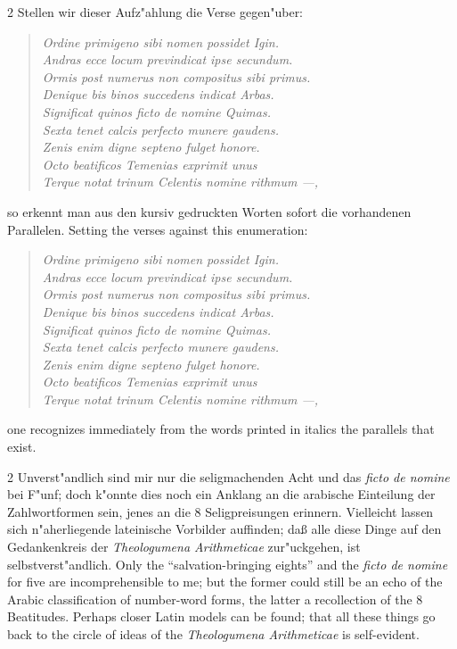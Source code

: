 \documentclass[10pt,a4paper]{article}
\renewcommand{\switchcolumn}{\syncronize\nointerlineskip\columnbreak}
\begin{document}
\begin{paracol}{2}
Stellen wir dieser Aufz"ahlung die Verse gegen"uber:
\begin{quote}
\textit{Ordine primigeno sibi nomen possidet Igin.}\\
\textit{Andras ecce locum previndicat ipse secundum.}\\
\textit{Ormis post numerus non compositus sibi primus.}\\
\textit{Denique bis binos succedens indicat Arbas.}\\
\textit{Significat quinos ficto de nomine Quimas.}\\
\textit{Sexta tenet calcis perfecto munere gaudens.}\\
\textit{Zenis enim digne septeno fulget honore.}\\
\textit{Octo beatificos Temenias exprimit unus}\\
\textit{Terque notat trinum Celentis nomine rithmum ---,}
\end{quote}
so erkennt man aus den kursiv gedruckten Worten sofort die vorhandenen Parallelen.
\switchcolumn
Setting the verses against this enumeration:
\begin{quote}
\textit{Ordine primigeno sibi nomen possidet Igin.}\\
\textit{Andras ecce locum previndicat ipse secundum.}\\
\textit{Ormis post numerus non compositus sibi primus.}\\
\textit{Denique bis binos succedens indicat Arbas.}\\
\textit{Significat quinos ficto de nomine Quimas.}\\
\textit{Sexta tenet calcis perfecto munere gaudens.}\\
\textit{Zenis enim digne septeno fulget honore.}\\
\textit{Octo beatificos Temenias exprimit unus}\\
\textit{Terque notat trinum Celentis nomine rithmum ---,}
\end{quote}
one recognizes immediately from the words printed in italics the parallels that exist.
\end{paracol}

\begin{paracol}{2}
Unverst"andlich sind mir nur die seligmachenden Acht und das \textit{ficto de nomine} bei F"unf; doch k"onnte dies noch ein Anklang an die arabische Einteilung der Zahlwortformen sein, jenes an die 8 Seligpreisungen erinnern. Vielleicht lassen sich n"aherliegende lateinische Vorbilder auffinden; da\ss{} alle diese Dinge auf den Gedankenkreis der \textit{Theologumena Arithmeticae} zur"uckgehen, ist selbstverst"andlich.
\switchcolumn
Only the ``salvation-bringing eights'' and the \textit{ficto de nomine} for five are incomprehensible to me; but the former could still be an echo of the Arabic classification of number-word forms, the latter a recollection of the 8 Beatitudes. Perhaps closer Latin models can be found; that all these things go back to the circle of ideas of the \textit{Theologumena Arithmeticae} is self-evident.
\end{paracol}
\end{document}
